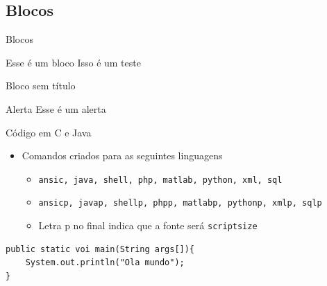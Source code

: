 \documentclass[aspectratio=169]{beamer}
\begin{document}
\subsection{Blocos}


\begin{frame}{Blocos}
	\begin{block}{Esse é um bloco}
		Isso é um teste
	\end{block}
	\begin{block}{}
	Bloco sem título	
	\end{block}
	\begin{alertblock}{Alerta}
		Esse é um alerta
	\end{alertblock}
\end{frame}


\begin{frame}[fragile]{Código em C e Java}

\begin{itemize}
		\item Comandos criados para as seguintes linguagens
		\begin{itemize}
			\item \texttt{ansic, java, shell, php, matlab, python, xml, sql}
			\item \texttt{ansicp, javap, shellp, phpp, matlabp, pythonp, xmlp, sqlp}
			\item Letra p no final indica que a fonte será \texttt{scriptsize}
		\end{itemize}
\end{itemize}




 
\begin{lstlisting}[style=java,caption={Meu primeiro programa em Java},label={ola-java},captionpos=b]
public static voi main(String args[]){
	System.out.println("Ola mundo");
}
\end{lstlisting}		
\end{frame}
\end{document}
